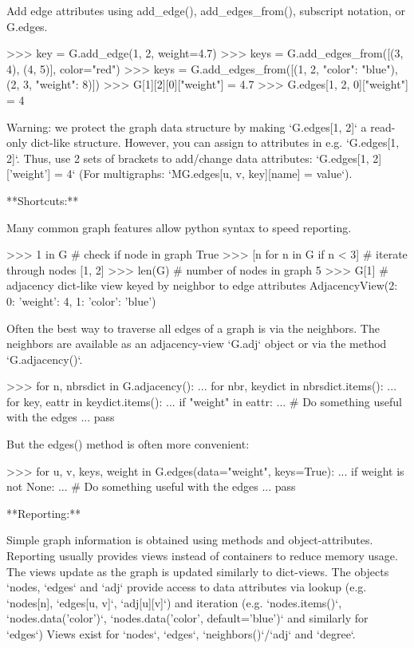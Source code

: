 \begin{DoxyVerb}
Add edge attributes using add_edge(), add_edges_from(), subscript
notation, or G.edges.

>>> key = G.add_edge(1, 2, weight=4.7)
>>> keys = G.add_edges_from([(3, 4), (4, 5)], color="red")
>>> keys = G.add_edges_from([(1, 2, {"color": "blue"}), (2, 3, {"weight": 8})])
>>> G[1][2][0]["weight"] = 4.7
>>> G.edges[1, 2, 0]["weight"] = 4

Warning: we protect the graph data structure by making `G.edges[1, 2]` a
read-only dict-like structure. However, you can assign to attributes
in e.g. `G.edges[1, 2]`. Thus, use 2 sets of brackets to add/change
data attributes: `G.edges[1, 2]['weight'] = 4`
(For multigraphs: `MG.edges[u, v, key][name] = value`).

**Shortcuts:**

Many common graph features allow python syntax to speed reporting.

>>> 1 in G  # check if node in graph
True
>>> [n for n in G if n < 3]  # iterate through nodes
[1, 2]
>>> len(G)  # number of nodes in graph
5
>>> G[1]  # adjacency dict-like view keyed by neighbor to edge attributes
AdjacencyView({2: {0: {'weight': 4}, 1: {'color': 'blue'}}})

Often the best way to traverse all edges of a graph is via the neighbors.
The neighbors are available as an adjacency-view `G.adj` object or via
the method `G.adjacency()`.

>>> for n, nbrsdict in G.adjacency():
...     for nbr, keydict in nbrsdict.items():
...         for key, eattr in keydict.items():
...             if "weight" in eattr:
...                 # Do something useful with the edges
...                 pass

But the edges() method is often more convenient:

>>> for u, v, keys, weight in G.edges(data="weight", keys=True):
...     if weight is not None:
...         # Do something useful with the edges
...         pass

**Reporting:**

Simple graph information is obtained using methods and object-attributes.
Reporting usually provides views instead of containers to reduce memory
usage. The views update as the graph is updated similarly to dict-views.
The objects `nodes, `edges` and `adj` provide access to data attributes
via lookup (e.g. `nodes[n], `edges[u, v]`, `adj[u][v]`) and iteration
(e.g. `nodes.items()`, `nodes.data('color')`,
`nodes.data('color', default='blue')` and similarly for `edges`)
Views exist for `nodes`, `edges`, `neighbors()`/`adj` and `degree`.


\end{DoxyVerb}
